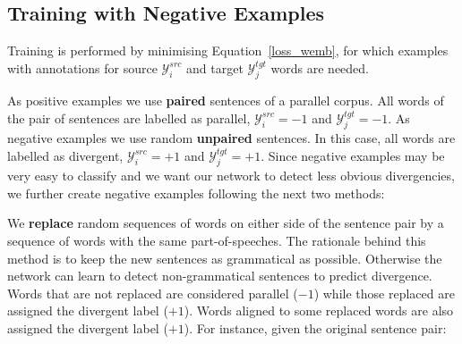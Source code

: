 \documentclass[11pt,a4paper]{article}
\begin{document}






\subsection{Training with Negative Examples}
\label{training}

Training is performed by minimising Equation~\ref{loss_wemb}, for which examples with annotations for source $\mathcal{Y}_i^{src}$ and target $\mathcal{Y}_j^{tgt}$ words are needed.

As positive examples we use {\bf paired} sentences of a parallel corpus. All words of the pair of sentences are labelled as parallel, $\mathcal{Y}_i^{src}=-1$ and $\mathcal{Y}_j^{tgt}=-1$. 
As negative examples we use random {\bf unpaired} sentences. In this case, all words are labelled as divergent, $\mathcal{Y}_i^{src}=+1$ and $\mathcal{Y}_j^{tgt}=+1$. 
Since negative examples may be very easy to classify and we want our network to detect less obvious divergencies, we further create negative examples following the next two methods:

We {\bf replace} random sequences of words on either side of the sentence pair by a sequence of words with the same part-of-speeches. 
The rationale behind this method is to keep the new sentences as grammatical as possible. 
Otherwise the network can learn to detect non-grammatical sentences to predict divergence.
Words that are not replaced are considered parallel ($-1$) while those replaced are assigned the divergent label ($+1$). 
Words aligned to some replaced words are also assigned the divergent label ($+1$). For instance, given the original sentence pair:
\end{document}
